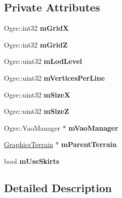 \subsection*{Private Attributes}
\begin{DoxyCompactItemize}
\item 
\mbox{\label{class_terrain_cell_a3fc98b2ee05739280e3dec8c4d91e290}} 
Ogre\+::int32 {\bfseries m\+GridX}
\item 
\mbox{\label{class_terrain_cell_ac01ed3002ab87b2c6c2c1e5a39ab5d4d}} 
Ogre\+::int32 {\bfseries m\+GridZ}
\item 
\mbox{\label{class_terrain_cell_abc9f1535a3da3c3e1c80d9567681047c}} 
Ogre\+::uint32 {\bfseries m\+Lod\+Level}
\item 
\mbox{\label{class_terrain_cell_a1fd4b491f1498c0b7361e6d96e4f68b4}} 
Ogre\+::uint32 {\bfseries m\+Vertices\+Per\+Line}
\item 
\mbox{\label{class_terrain_cell_a2945051368d39ae7c66c3141512494aa}} 
Ogre\+::uint32 {\bfseries m\+SizeX}
\item 
\mbox{\label{class_terrain_cell_af8d4da89fae46ce6f992b3ac3bdebb3a}} 
Ogre\+::uint32 {\bfseries m\+SizeZ}
\item 
\mbox{\label{class_terrain_cell_acee45ec139b4e355c80177b69a615273}} 
Ogre\+::\+Vao\+Manager $\ast$ {\bfseries m\+Vao\+Manager}
\item 
\mbox{\label{class_terrain_cell_a7231f8324675209a60f0bb97628143e5}} 
\hyperlink{class_graphics_terrain}{Graphics\+Terrain} $\ast$ {\bfseries m\+Parent\+Terrain}
\item 
\mbox{\label{class_terrain_cell_a6389d57d6de64f4c2bcdc56aa5feccd1}} 
bool {\bfseries m\+Use\+Skirts}
\end{DoxyCompactItemize}


\subsection{Detailed Description}


